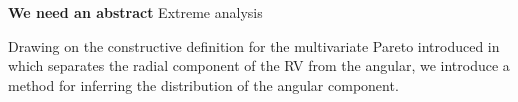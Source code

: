 {\bf We need an abstract}
Extreme analysis 


Drawing on the constructive definition for the multivariate Pareto introduced in~\cite{ferreira2014} which separates the radial component of the RV from the angular, we introduce a method for inferring the distribution of the angular component.  

